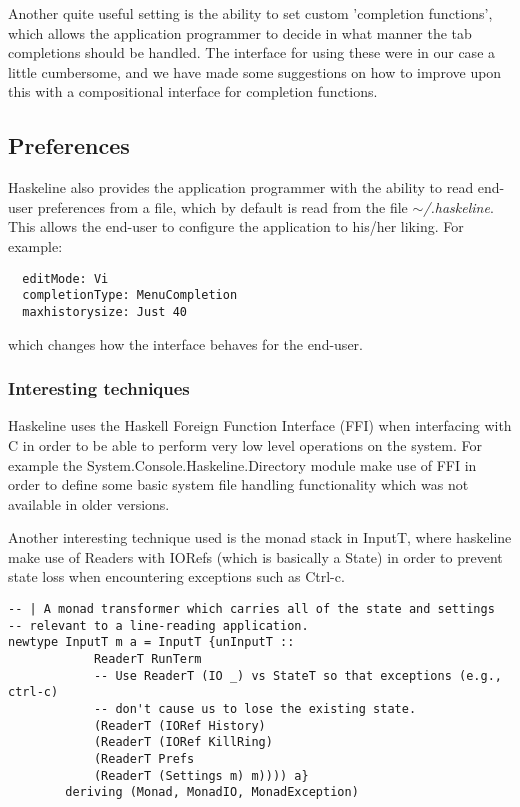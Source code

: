 \documentclass[11pt,a4paper]{article}
\begin{document}
Another quite useful setting is the ability to set custom 'completion
functions', which allows the application programmer to decide in what manner the
tab completions should be handled. The interface for using these were in our
case a little cumbersome, and we have made some suggestions on how to improve
upon this with a compositional interface for completion functions.

\subsection{Preferences}
Haskeline also provides the application programmer with the ability to read
end-user preferences from a file, which by default is read from the file
$\mathtt{\sim}$\textit{/.haskeline}. This allows the end-user to configure the
application to his/her liking. For example:

\begin{verbatim}
  editMode: Vi
  completionType: MenuCompletion
  maxhistorysize: Just 40
\end{verbatim}

which changes how the interface behaves for the end-user.

\subsubsection{Interesting techniques}
Haskeline uses the Haskell Foreign Function Interface (FFI) when interfacing
with C in order to be able to perform very low level operations on the system.
For example the System.Console.Haskeline.Directory module make use of FFI in
order to define some basic system file handling functionality which was not
available in older versions.

Another interesting technique used is the monad stack in InputT, where
haskeline make use of Readers with IORefs (which is basically a State) in order
to prevent state loss when encountering exceptions such as Ctrl-c.

\begin{verbatim}
-- | A monad transformer which carries all of the state and settings
-- relevant to a line-reading application.
newtype InputT m a = InputT {unInputT ::
            ReaderT RunTerm
            -- Use ReaderT (IO _) vs StateT so that exceptions (e.g., ctrl-c)
            -- don't cause us to lose the existing state.
            (ReaderT (IORef History)
            (ReaderT (IORef KillRing)
            (ReaderT Prefs
            (ReaderT (Settings m) m)))) a}
        deriving (Monad, MonadIO, MonadException)
\end{verbatim}
\end{document}
